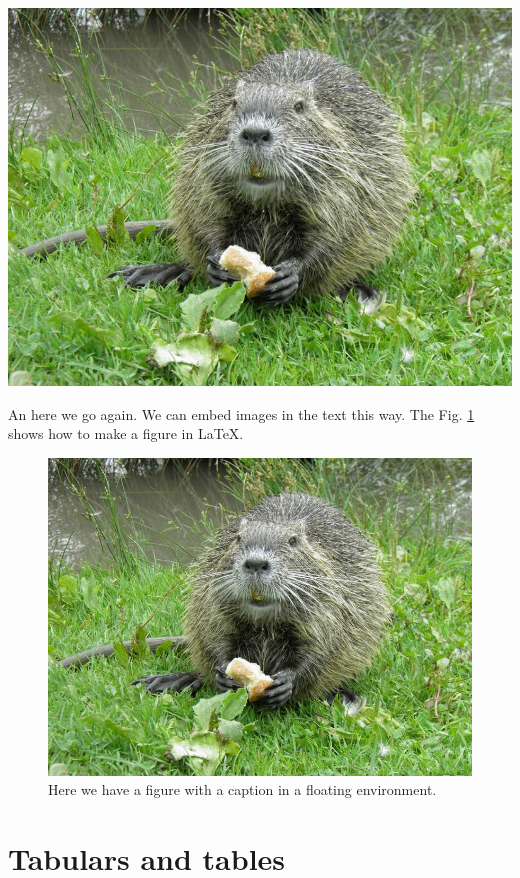 \documentclass[10pt,a4paper,twoside]{article}
\begin{document}
\begin{center}
  \includegraphics[width = .8\textwidth]{figures/ragondin_small.jpg}
\end{center}

\noindent An here we go again.
We can embed images in the text this way.
The Fig. \ref{fig:ragondin_explained} shows how to make a figure in \LaTeX .

\begin{figure}[hb]
  \begin{center}
    \includegraphics[width = .8\textwidth]{figures/ragondin_small.jpg}
    \caption{Here we have a figure with a caption in a floating environment.
      \blindtext[1]}
    \label{fig:ragondin_explained}
  \end{center}
\end{figure}


\blindtext[4]

\section{Tabulars and tables}
\end{document}
